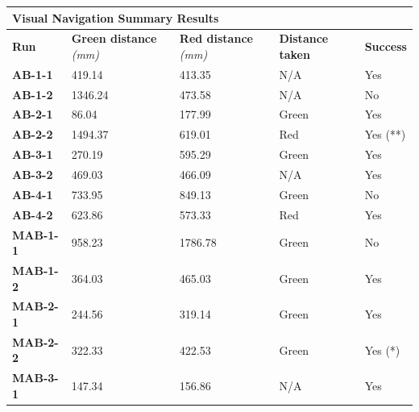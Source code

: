 \documentclass[a4paper,11pt,twoside,openright]{article}
\begin{document}
\begin{table}[]
\centering
\begin{tabular}{|l|l|l|l|l|}
\hline
\multicolumn{5}{|l|}{\textbf{Visual Navigation Summary Results}}                                                \\ \hline
\textbf{Run}     & \textbf{Green distance} \textit{(mm)} & \textbf{Red distance} \textit{(mm)} & \textbf{Distance taken} & \textbf{Success} \\ \hline
\textbf{AB-1-1}  & 419.14                  & 413.35                & N/A                     & Yes              \\ \hline
\textbf{AB-1-2}  & 1346.24                 & 473.58                & N/A                     & No               \\ \hline
\textbf{AB-2-1}  & 86.04                   & 177.99                & Green                   & Yes              \\ \hline
\textbf{AB-2-2}  & 1494.37                 & 619.01                & Red                     & Yes (**)         \\ \hline
\textbf{AB-3-1}  & 270.19                  & 595.29                & Green                   & Yes              \\ \hline
\textbf{AB-3-2}  & 469.03                  & 466.09                & N/A                     & Yes              \\ \hline
\textbf{AB-4-1}  & 733.95                  & 849.13                & Green                   & No               \\ \hline
\textbf{AB-4-2}  & 623.86                  & 573.33                & Red                     & Yes              \\ \hline
\textbf{MAB-1-1} & 958.23                  & 1786.78               & Green                   & No               \\ \hline
\textbf{MAB-1-2} & 364.03                  & 465.03                & Green                   & Yes              \\ \hline
\textbf{MAB-2-1} & 244.56                  & 319.14                & Green                   & Yes              \\ \hline
\textbf{MAB-2-2} & 322.33                  & 422.53                & Green                   & Yes (*)          \\ \hline
\textbf{MAB-3-1} & 147.34                  & 156.86                & N/A                     & Yes              \\ \hline

\end{tabular}
\end{table}
\end{document}
